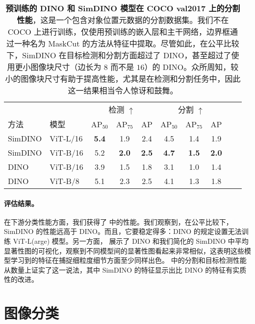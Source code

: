 \documentclass[../../book-main_zh.tex]{subfiles}
\begin{document}
\begin{table}
    \centering 
    \begin{tabular}{@{}llcccccccc@{}}
        \toprule
         &  & \multicolumn{3}{c}{检测 $\uparrow$} &  \multicolumn{3}{c}{分割 $\uparrow$} \\ 
        方法 & 模型 & AP$_{50}$  & AP$_{75}$ & AP & AP$_{50}$ & AP$_{75}$ & AP  \\ 
        \midrule
        SimDINO &ViT-L/16 &\bf 5.4 &1.9 &2.4 &4.5 &1.4 &1.9 \\
        SimDINO &ViT-B/16 &5.2 & \bf 2.0 & \bf 2.5 & \bf4.7 & \bf 1.5 & \bf 2.0 \\
        DINO &ViT-B/16 &3.9 &1.5 &1.8 &3.1 &1.0 &1.4 \\
        \midrule
        \color{gray} DINO & \color{gray} ViT-B/8 & \color{gray}5.1 & \color{gray}2.3 & \color{gray}2.5 & \color{gray}4.1 & \color{gray}1.3 & \color{gray}1.8 \\
        \bottomrule
    \end{tabular}
    \caption{\small\textbf{预训练的 DINO 和 SimDINO 模型在 COCO val2017 \citep{lin2014microsoft} 上的分割性能}，这是一个包含对象位置元数据的分割数据集。我们不在 COCO 上进行训练，仅使用预训练的嵌入层和主干网络，边界框通过一种名为 MaskCut \citep{wang2023cut} 的方法从特征中提取。尽管如此，在公平比较下，SimDINO 在目标检测和分割方面超过了 DINO，甚至超过了使用更小图像块尺寸（边长为 \(8\) 而不是 \(16\)）的 DINO。众所周知，较小的图像块尺寸有助于提高性能，尤其是在检测和分割任务中，因此这一结果相当令人惊讶和鼓舞。}
    \label{tab:dino_segmentation}
\end{table}

\paragraph{评估结果。} 在下游分类性能方面，我们获得了  中的性能。我们观察到，在公平比较下，SimDINO 的性能远高于 DINO。而且，它要稳定得多：DINO 的规定设置无法训练 ViT-L(arge) 模型。另一方面， 展示了 DINO 和我们简化的 SimDINO 中平均显著性图的可视化，观察到不同模型间的显著性图看起来非常相似，这表明这些模型学习到的特征在捕捉细粒度细节方面至少同样出色。 中的分割和目标检测性能从数量上证实了这一说法，其中 SimDINO 的特征显示出比 DINO 的特征有实质性的改进。



\section{图像分类}
\end{document}
